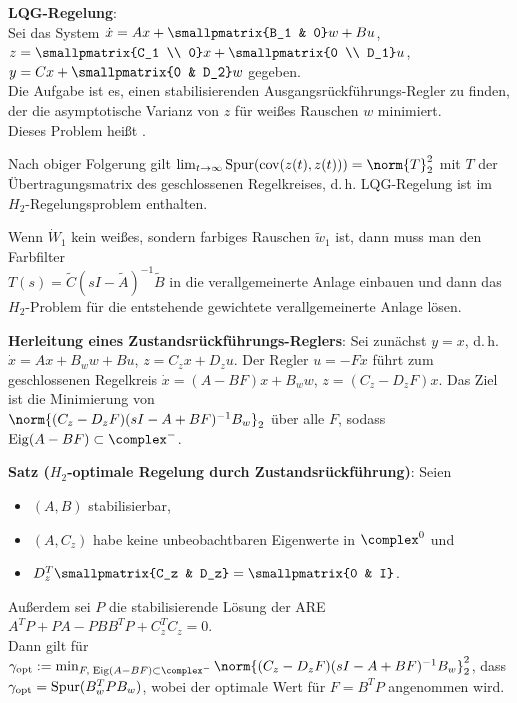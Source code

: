 \textbf{LQG-Regelung}:\\
Sei das System $\dot{x} = Ax + \smallpmatrix{B_1 & 0} w + Bu$,
$z = \smallpmatrix{C_1 \\ 0} x + \smallpmatrix{0 \\ D_1} u$,
$y = Cx + \smallpmatrix{0 & D_2} w$ gegeben.\\
Die Aufgabe ist es, einen stabilisierenden Ausgangsrückführungs-Regler zu finden, der die
asymptotische Varianz von $z$ für weißes Rauschen $w$ minimiert.\\
Dieses Problem heißt .

Nach obiger Folgerung gilt
$\lim_{t \to \infty} \Spur(\cov(z(t), z(t))) = \norm{T}_2^2$ mit $T$ der Übertragungsmatrix des
geschlossenen Regelkreises,
d.\,h. LQG-Regelung ist im $H_2$-Regelungsproblem enthalten.

Wenn $\dot{W}_1$ kein weißes, sondern farbiges Rauschen $\widetilde{w}_1$ ist, dann muss man den
Farbfilter\\
$T(s) = \widetilde{C} (sI - \widetilde{A})^{-1} \widetilde{B}$ in die verallgemeinerte
Anlage einbauen und dann das $H_2$-Problem für die entstehende gewichtete verallgemeinerte Anlage
lösen.

\linie

\textbf{Herleitung eines Zustandsrückführungs-Reglers}:
Sei zunächst $y = x$, d.\,h.\\
$\dot{x} = Ax + B_w w + Bu$, $z = C_z x + D_z u$.
Der Regler $u = -Fx$ führt zum geschlossenen Regelkreis
$\dot{x} = (A - BF)x + B_w w$, $z = (C_z - D_z F)x$.
Das Ziel ist die Minimierung von\\
$\norm{(C_z - D_z F)(sI - A + BF)^{-1} B_w}_2$
über alle $F$, sodass $\Eig(A - BF) \subset \complex^-$.

\textbf{Satz ($H_2$-optimale Regelung durch Zustandsrückführung)}:
Seien
\begin{itemize}
    \item
    $(A, B)$ stabilisierbar,
    
    \item
    $(A, C_z)$ habe keine unbeobachtbaren Eigenwerte in $\complex^0$ und
    
    \item
    $D_z^T \smallpmatrix{C_z & D_z} = \smallpmatrix{0 & I}$.
\end{itemize}
Außerdem sei $P$ die stabilisierende Lösung der ARE $A^T P + PA - PBB^T P + C_z^T C_z = 0$.\\
Dann gilt für
$\gamma_\opt := \min_{F,\;\Eig(A-BF)\subset\complex^-}
\norm{(C_z - D_z F)(sI - A + BF)^{-1} B_w}_2^2$, dass\\
$\gamma_{\text{opt}} = \operatorname{Spur}(B_w^T P B_w)$, wobei der optimale Wert für $F = B^T P$ angenommen wird.

